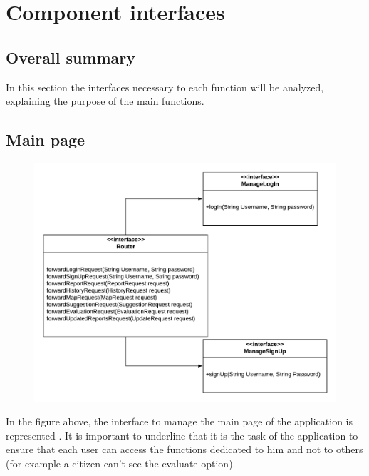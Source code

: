 \documentclass[12pt,a4paper]{report}
\begin{document}
		\section{Component interfaces}
			\subsection{Overall summary}
				In this section the interfaces necessary to each function will be analyzed, explaining the purpose of the main
				functions.
			\subsection{Main page}
				\begin{figure}[H]
						\includegraphics[width = \textwidth, center]{mainInterface}
						\label{fig: interfaces}
				\end{figure}
In the figure above, the interface to manage the main page of the application is represented .
				It is important to underline that it is the task of the application to ensure that each user can access the
				functions dedicated to him and not to others (for example a citizen can't see the evaluate option).
\end{document}
